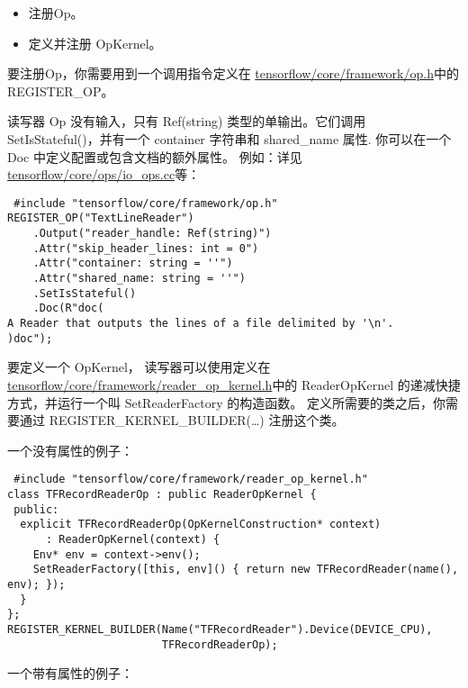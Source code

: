 \begin{itemize}
\tightlist
\item
  注册Op。
\item
  定义并注册 OpKernel。
\end{itemize}

要注册Op，你需要用到一个调用指令定义在
\href{https://tensorflow.googlesource.com/tensorflow/+/master/tensorflow/core/framework/op.h}{tensorflow/core/framework/op.h}中的REGISTER\_OP。

读写器 Op 没有输入，只有 Ref(string) 类型的单输出。它们调用
SetIsStateful()，并有一个 container 字符串和 shared\_name 属性.
你可以在一个 Doc 中定义配置或包含文档的额外属性。 例如：详见
\href{https://tensorflow.googlesource.com/tensorflow/+/master/tensorflow/core/ops/io_ops.cc}{tensorflow/core/ops/io\_ops.cc}等：

\begin{verbatim}
 #include "tensorflow/core/framework/op.h"
REGISTER_OP("TextLineReader")
    .Output("reader_handle: Ref(string)")
    .Attr("skip_header_lines: int = 0")
    .Attr("container: string = ''")
    .Attr("shared_name: string = ''")
    .SetIsStateful()
    .Doc(R"doc(
A Reader that outputs the lines of a file delimited by '\n'.
)doc");
\end{verbatim}

要定义一个 OpKernel，
读写器可以使用定义在\href{https://tensorflow.googlesource.com/tensorflow/+/master/tensorflow/core/framework/reader_op_kernel.h}{tensorflow/core/framework/reader\_op\_kernel.h}中的
ReaderOpKernel 的递减快捷方式，并运行一个叫 SetReaderFactory
的构造函数。 定义所需要的类之后，你需要通过
REGISTER\_KERNEL\_BUILDER(\ldots{}) 注册这个类。

一个没有属性的例子：

\begin{verbatim}
 #include "tensorflow/core/framework/reader_op_kernel.h"
class TFRecordReaderOp : public ReaderOpKernel {
 public:
  explicit TFRecordReaderOp(OpKernelConstruction* context)
      : ReaderOpKernel(context) {
    Env* env = context->env();
    SetReaderFactory([this, env]() { return new TFRecordReader(name(), env); });
  }
};
REGISTER_KERNEL_BUILDER(Name("TFRecordReader").Device(DEVICE_CPU),
                        TFRecordReaderOp);
\end{verbatim}

一个带有属性的例子：

